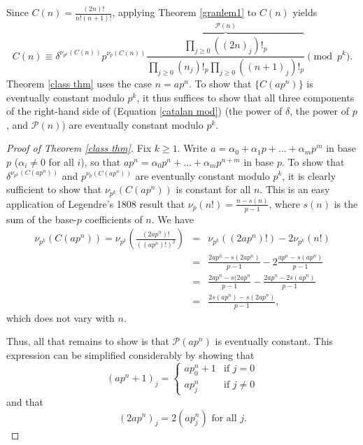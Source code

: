 \documentclass[12pt, letter]{article}    %
\theoremstyle{plain}
\theoremstyle{definition}
\numberwithin{equation}{section}
\newcommand{\thref}[1]{Theorem \ref{#1}}
\newcommand{\eref}[1]{Equation \ref{#1}}
\begin{document}
\noindent Since $C(n)=\frac{(2n)!}{n!(n+1)!}$, applying \thref{granlem1} to $C(n)$ yields \begin{equation}\label{catalan mod}C(n)\equiv \delta^{\nu_{p^k}(C(n))}p^{\nu_p(C(n))}\overbrace{\frac{\prod_{j\geq0}((2n)_j)!_p}{\prod_{j\geq 0}(n_j)!_p\prod_{j\geq 0}((n+1)_j)!_p}}^{\mathcal{P}(n)} \pmod{p^k}.\end{equation} 
\thref{class thm} uses the case $n=ap^n$. To show that $\{C(ap^n)\}$ is eventually constant modulo $p^k$, it thus suffices to show that all three components of the right-hand side of (\eref{catalan mod}) (the power of $\delta$, the power of $p$, and $\mathcal{P}(n)$) are eventually constant modulo $p^k$.

\begin{proof}[Proof of \thref{class thm}] Fix $k\geq1$. Write $a=\alpha_0+\alpha_1p+\dots+\alpha_mp^m$ in base $p$ ($\alpha_i\neq0$ for all $i$), so that $ap^n=\alpha_0p^n+\dots+\alpha_mp^{n+m}$ in base $p$. To show that $\delta^{\nu_{p^k}(C(ap^n))}$ and  $p^{\nu_p(C(ap^n))}$ are eventually constant modulo $p^k$, it is clearly sufficient to show that $\nu_{p^k}(C(ap^n))$ is constant for all $n$. This is an easy application of Legendre's 1808 result that $\nu_p(n!)=\frac{n-s(n)}{p-1}$, where $s(n)$ is the sum of the base-$p$ coefficients of $n$. We have 
\begin{eqnarray*}
\nu_{p^k}(C(ap^n))=\nu_{p^k}\left(\frac{(2ap^n)!}{((ap^n)!)^2}\right)&=&\nu_{p^k}((2ap^n)!)-2\nu_{p^k}(n!)\\
&=&\frac{2ap^n-s(2ap^n)}{p-1}-2\frac{ap^n-s(ap^n)}{p-1}\\
&=&\frac{2ap^n-s(2ap^n}{p-1}-\frac{2ap^n-2s(ap^n)}{p-1}\\
&=&\frac{2s(ap^n)-s(2ap^n)}{p-1},
\end{eqnarray*}
which does not vary with $n$.

Thus, all that remains to show is that $\mathcal{P}(ap^n)$ is eventually constant. This expression can be simplified considerably by showing that
\begin{equation}\label{apn1} (ap^n+1)_j=\begin{cases} ap^n_0+1 &\mbox{if } j=0 \\ ap^n_j &\mbox{if } j\neq0 \end{cases}\end{equation} and that \begin{equation}\label{2apn} (2ap^n)_j=2(ap^n_j) \mbox{ for all } j.\end{equation}


\end{proof}
\end{document}
